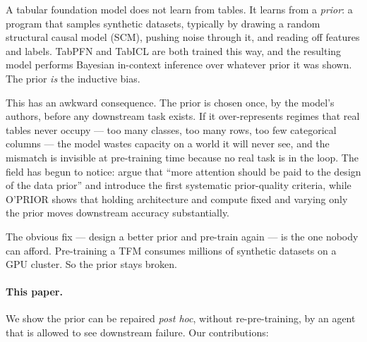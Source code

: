 \documentclass{article}
\begin{document}
A tabular foundation model does not learn from tables. It learns from a \emph{prior}: a
program that samples synthetic datasets, typically by drawing a random structural causal
model (SCM), pushing noise through it, and reading off features and labels. TabPFN
\cite{hollmann2023tabpfn,hollmann2025tabpfnv2} and TabICL \cite{qu2025tabicl} are both
trained this way, and the resulting model performs Bayesian in-context inference over
whatever prior it was shown. The prior \emph{is} the inductive bias.

This has an awkward consequence. The prior is chosen once, by the model's authors, before
any downstream task exists. If it over-represents regimes that real tables never occupy ---
too many classes, too many rows, too few categorical columns --- the model wastes capacity
on a world it will never see, and the mismatch is invisible at pre-training time because no
real task is in the loop. The field has begun to notice: \citet{zhang2025mitra} argue that
``more attention should be paid to the design of the data prior'' and introduce the first
systematic prior-quality criteria, while O'PRIOR \cite{bouadi2026oprior} shows that holding
architecture and compute fixed and varying only the prior moves downstream accuracy
substantially.

The obvious fix --- design a better prior and pre-train again --- is the one nobody can
afford. Pre-training a TFM consumes millions of synthetic datasets on a GPU cluster. So the
prior stays broken.

\paragraph{This paper.} We show the prior can be repaired \emph{post hoc}, without
re-pre-training, by an agent that is allowed to see downstream failure. Our contributions:
\end{document}
